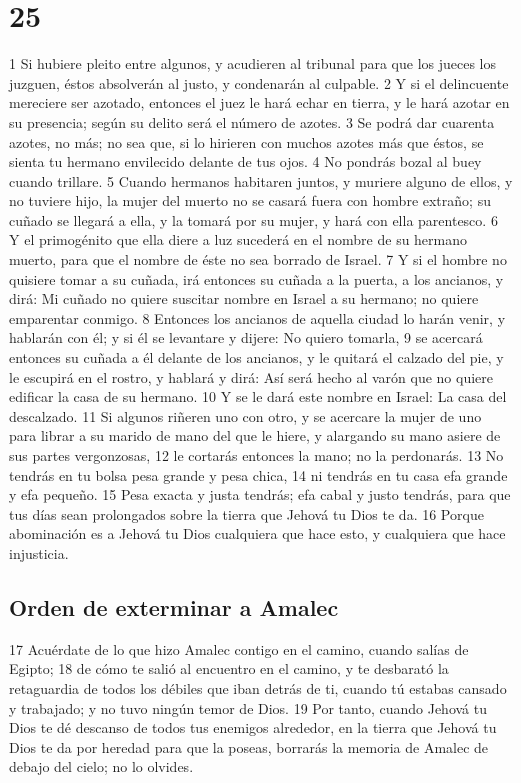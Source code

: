 \chapter{25}


1 Si hubiere pleito entre algunos, y acudieren al tribunal para que los jueces los juzguen, éstos absolverán al justo, y condenarán al culpable.
2 Y si el delincuente mereciere ser azotado, entonces el juez le hará echar en tierra, y le hará azotar en su presencia; según su delito será el número de azotes.
3 Se podrá dar cuarenta azotes, no más; no sea que, si lo hirieren con muchos azotes más que éstos, se sienta tu hermano envilecido delante de tus ojos.
4 No pondrás bozal al buey cuando trillare.
5 Cuando hermanos habitaren juntos, y muriere alguno de ellos, y no tuviere hijo, la mujer del muerto no se casará fuera con hombre extraño; su cuñado se llegará a ella, y la tomará por su mujer, y hará con ella parentesco.
6 Y el primogénito que ella diere a luz sucederá en el nombre de su hermano muerto, para que el nombre de éste no sea borrado de Israel. 
7 Y si el hombre no quisiere tomar a su cuñada, irá entonces su cuñada a la puerta, a los ancianos, y dirá: Mi cuñado no quiere suscitar nombre en Israel a su hermano; no quiere emparentar conmigo.
8 Entonces los ancianos de aquella ciudad lo harán venir, y hablarán con él; y si él se levantare y dijere: No quiero tomarla,
9 se acercará entonces su cuñada a él delante de los ancianos, y le quitará el calzado del pie, y le escupirá en el rostro, y hablará y dirá: Así será hecho al varón que no quiere edificar la casa de su hermano.
10 Y se le dará este nombre en Israel: La casa del descalzado. 
11 Si algunos riñeren uno con otro, y se acercare la mujer de uno para librar a su marido de mano del que le hiere, y alargando su mano asiere de sus partes vergonzosas,
12 le cortarás entonces la mano; no la perdonarás.
13 No tendrás en tu bolsa pesa grande y pesa chica,
14 ni tendrás en tu casa efa   grande y efa pequeño.
15 Pesa exacta y justa tendrás; efa   cabal y justo tendrás, para que tus días sean prolongados sobre la tierra que Jehová tu Dios te da.
16 Porque abominación es a Jehová tu Dios cualquiera que hace esto, y cualquiera que hace injusticia. 

\section{Orden de exterminar a Amalec}

17 Acuérdate de lo que hizo Amalec contigo en el camino, cuando salías de Egipto;
18 de cómo te salió al encuentro en el camino, y te desbarató la retaguardia de todos los débiles que iban detrás de ti, cuando tú estabas cansado y trabajado; y no tuvo ningún temor de Dios.
19 Por tanto, cuando Jehová tu Dios te dé descanso de todos tus enemigos alrededor, en la tierra que Jehová tu Dios te da por heredad para que la poseas, borrarás la memoria de Amalec de debajo del cielo; no lo olvides. 

